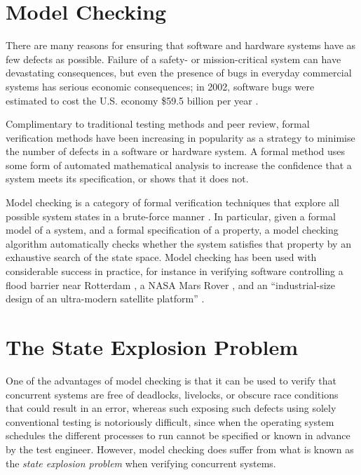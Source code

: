 \documentclass[12pt,a4paper,twoside,openright]{report}
\begin{document}
\section{Model Checking}

There are many reasons for ensuring that
software and hardware systems have as
few defects as possible. Failure of a
safety- or mission-critical system can
have devastating consequences, but even the
presence of bugs in everyday commercial systems has
serious economic consequences; in 2002,
software bugs were estimated to cost
the U.S. economy \$59.5 billion per year \cite{tass02}.

Complimentary to traditional testing methods
and peer review, formal verification methods have been
increasing in popularity as a strategy
to minimise the number of defects in a
software or hardware system. A formal
method uses some form of automated
mathematical analysis to increase
the confidence that a system meets its
specification, or shows that it does not.

Model checking is a category of formal
verification techniques
that explore all possible system states in a
brute-force manner \cite{bai08}. In particular,
given a formal model of a system, and a
formal specification of a property, a model
checking algorithm automatically checks whether the
system satisfies that property by an
exhaustive search of the state space.
Model checking has been used with considerable
success in practice, for instance in verifying
software controlling a flood barrier near
Rotterdam \cite{kars96},
a NASA Mars Rover \cite{brat04},
and an ``industrial-size design of an
ultra-modern satellite platform'' \cite{est12}.

\section{The State Explosion Problem}

One of the advantages of model checking is
that it can be used to verify that concurrent
systems are free of deadlocks, livelocks, or
obscure race conditions that could result in
an error, whereas such exposing such defects
using solely conventional testing is notoriously
difficult, since when the operating system
schedules the different processes to run
cannot be specified or known in advance by the
test engineer. However, model checking does
suffer from what is known as the
\textit{state explosion problem} when verifying
concurrent systems.
\end{document}
